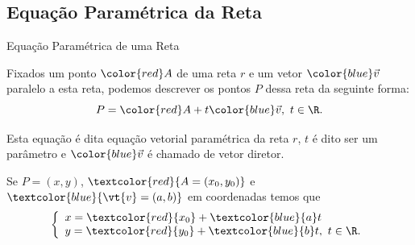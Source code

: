 
\subsection*{Equação Paramétrica da Reta}


\begin{frame}[label=retas]{Equação Paramétrica de uma Reta}

Fixados um ponto ${\color{red} A}$ de uma reta $r$ e um vetor ${\color{blue}\vec{v}}$ paralelo a esta reta, podemos descrever os pontos $P$ dessa reta da seguinte forma:
\[P={\color{red}A}+t{\color{blue}\vec{v}},\ t\in \R.\]
	\begin{center}
	\end{center}
	
Esta equação é dita {\color{blue} equação vetorial paramétrica da reta $r$}, $t$ é dito ser um {\color{blue}parâmetro} e ${\color{blue}\vec{v}}$ é chamado de {\color{blue}vetor diretor.}

\end{frame}

\begin{frame}[label=retas]
Se	$P=(x,y)$, $\textcolor{red}{A=(x_0,y_0)}$ e $\textcolor{blue}{\vt{v}=(a,b)}$
em coordenadas temos que
\[	\left\{\begin{array}{l}
	x=\textcolor{red}{x_0}+\textcolor{blue}{a}t\\
	y=\textcolor{red}{y_0}+\textcolor{blue}{b}t,\  t\in \R.
	\end{array}\right.\]
\end{frame}